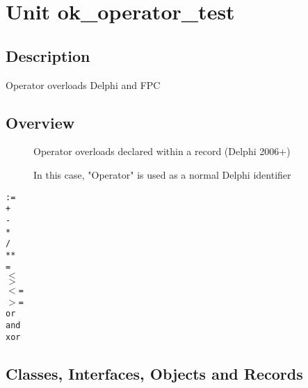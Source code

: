 \documentclass{report}
\begin{document}
\newlength{\tmplength}
\chapter{Unit ok{\_}operator{\_}test}
\section{Description}
Operator overloads Delphi and FPC
\section{Overview}
\begin{description}
\item[\texttt{\begin{ttfamily}TDelphiRec\end{ttfamily} Record}]Operator overloads declared within a record (Delphi 2006+)
\item[\texttt{\begin{ttfamily}TMyClass\end{ttfamily} Class}]In this case, "Operator" is used as a normal Delphi identifier
\item[\texttt{\begin{ttfamily}TMyType\end{ttfamily} Record}]
\item[\texttt{\begin{ttfamily}TMyType2\end{ttfamily} Record}]
\end{description}
\begin{description}
\item[\texttt{:=}]
\item[\texttt{+}]
\item[\texttt{-}]
\item[\texttt{*}]
\item[\texttt{/}]
\item[\texttt{**}]
\item[\texttt{=}]
\item[\texttt{{$<$}}]
\item[\texttt{{$>$}}]
\item[\texttt{{$<$}=}]
\item[\texttt{{$>$}=}]
\item[\texttt{or}]
\item[\texttt{and}]
\item[\texttt{xor}]
\end{description}
\section{Classes, Interfaces, Objects and Records}
\end{document}
